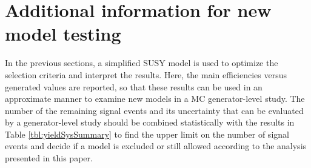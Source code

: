 \section{Additional information for new model testing}%
\label{sect:model}
In the previous sections, a simplified SUSY model is used to optimize the selection criteria and interpret the results. 
Here, the main efficiencies versus generated values are reported, so that these results can be used in an approximate manner to examine new models in a MC generator-level study. %
The number of the remaining signal events and its uncertainty that %
can be evaluated by a generator-level study 
should be combined statistically with the results in Table \ref{tbl:yieldSysSummary} to find the upper limit 
on the number of signal events
and decide if a model is excluded or still allowed according to  the analysis presented in this paper.

